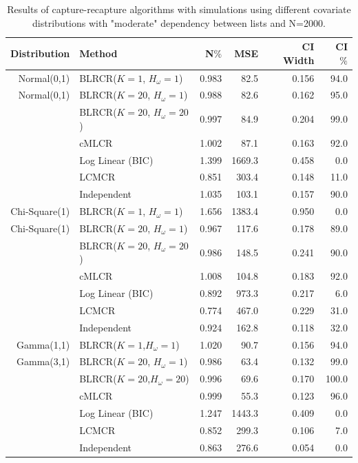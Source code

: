 \documentclass[
  12pt,
]{article}
\begin{document}
\singlespacing
\begin{table}[H]
\centering
\begin{tabular}{||r l r r r r||} 
 \hline
Distribution & Method & N$\%$ &MSE & CI Width & CI $\%$   \\ [0.5ex] 
 \hline\hline
 Normal(0,1)   & BLRCR($K=1$, $H_\omega=1$)  & 0.983   & 82.5   & 0.156   & 94.0 \\ 
 Normal(0,1)   & BLRCR($K=20$, $H_\omega=1$)    & 0.988     & 82.6     & 0.162     & 95.0 \\ 
               & BLRCR($K=20$, $H_\omega=20$)    & 0.997     & 84.9     & 0.204     & 99.0 \\
               & cMLCR       & 1.002       & 87.1      & 0.163      & 92.0 \\
               & Log Linear (BIC)  & 1.399      & 1669.3     & 0.458     & 0.0 \\ 
               & LCMCR       & 0.851       & 303.4      & 0.148      & 11.0 \\ 
               & Independent & 1.035 & 103.1& 0.157& 90.0 \\ 


 \hline
 Chi-Square(1)   & BLRCR($K=1$, $H_\omega=1$)  & 1.656   & 1383.4   & 0.950   & 0.0 \\ 
 Chi-Square(1)   & BLRCR($K=20$, $H_\omega=1$)    & 0.967     & 117.6     & 0.178     & 89.0 \\ 
                 & BLRCR($K=20$, $H_\omega=20$)    & 0.986     & 148.5     & 0.241     & 90.0 \\
               & cMLCR       & 1.008       & 104.8      & 0.183      & 92.0 \\
               & Log Linear (BIC)  & 0.892      & 973.3     & 0.217     & 6.0 \\ 
               & LCMCR       & 0.774       & 467.0      & 0.229      & 31.0 \\ 
               & Independent & 0.924 & 162.8& 0.118& 32.0 \\ 


 \hline
 Gamma(1,1)    & BLRCR($K=1$,$H_\omega=1$)  & 1.020   & 90.7   & 0.156   & 94.0 \\ 
 Gamma(3,1)    & BLRCR($K=20$, $H_\omega=1$)    & 0.986     & 63.4     & 0.132     & 99.0 \\ 
               & BLRCR($K=20$,$H_\omega=20$)    & 0.996     & 69.6     & 0.170     & 100.0 \\
               & cMLCR       & 0.999       & 55.3      & 0.123      & 96.0 \\
               & Log Linear (BIC)  & 1.247      & 1443.3     & 0.409     & 0.0 \\ 
               & LCMCR       & 0.852       & 299.3      & 0.106      & 7.0 \\ 
               & Independent & 0.863 & 276.6& 0.054& 0.0 \\ 
 \hline
\end{tabular}
\caption{Results of capture-recapture algorithms with simulations using different covariate distributions with "moderate" dependency between lists and N=2000.}
\label{table:diffdists}
\end{table}
\doublespacing
\end{document}
